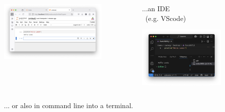 \documentclass[]{beamer}
\begin{document}
\begin{frame}
\begin{columns}
\begin{column}{0.33\textwidth}
      \centerline{{\includegraphics[angle=0,origin=c,height=30mm]{jupyterLeeds.png}}}      
      
      \vspace{10mm}
      \end{column}
      
      \begin{column}{0.3\textwidth}
      \vspace{10mm}
      
      ...an IDE \\ (e.g. VScode)
      
      \centerline{\includegraphics[angle=0,origin=c,height=30mm]{vscodeLeeds.png}}      
      \vspace{5mm}            
      \end{column}  
          
      \end{columns}
      \vspace{5mm}
\hfill  ... or also in command line into a terminal.

\end{frame}
\end{document}
